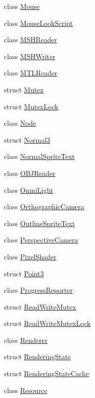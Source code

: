 \begin{DoxyCompactItemize}
\item 
class \hyperlink{classmage_1_1_mouse}{Mouse}
\item 
class \hyperlink{classmage_1_1_mouse_look_script}{Mouse\+Look\+Script}
\item 
class \hyperlink{classmage_1_1_m_s_h_reader}{M\+S\+H\+Reader}
\item 
class \hyperlink{classmage_1_1_m_s_h_writer}{M\+S\+H\+Writer}
\item 
class \hyperlink{classmage_1_1_m_t_l_reader}{M\+T\+L\+Reader}
\item 
struct \hyperlink{structmage_1_1_mutex}{Mutex}
\item 
struct \hyperlink{structmage_1_1_mutex_lock}{Mutex\+Lock}
\item 
class \hyperlink{classmage_1_1_node}{Node}
\item 
struct \hyperlink{structmage_1_1_normal3}{Normal3}
\item 
class \hyperlink{classmage_1_1_normal_sprite_text}{Normal\+Sprite\+Text}
\item 
class \hyperlink{classmage_1_1_o_b_j_reader}{O\+B\+J\+Reader}
\item 
class \hyperlink{classmage_1_1_omni_light}{Omni\+Light}
\item 
class \hyperlink{classmage_1_1_orthographic_camera}{Orthographic\+Camera}
\item 
class \hyperlink{classmage_1_1_outline_sprite_text}{Outline\+Sprite\+Text}
\item 
class \hyperlink{classmage_1_1_perspective_camera}{Perspective\+Camera}
\item 
class \hyperlink{classmage_1_1_pixel_shader}{Pixel\+Shader}
\item 
struct \hyperlink{structmage_1_1_point3}{Point3}
\item 
class \hyperlink{classmage_1_1_progress_reporter}{Progress\+Reporter}
\item 
struct \hyperlink{structmage_1_1_read_write_mutex}{Read\+Write\+Mutex}
\item 
struct \hyperlink{structmage_1_1_read_write_mutex_lock}{Read\+Write\+Mutex\+Lock}
\item 
class \hyperlink{classmage_1_1_renderer}{Renderer}
\item 
struct \hyperlink{structmage_1_1_rendering_state}{Rendering\+State}
\item 
struct \hyperlink{structmage_1_1_rendering_state_cache}{Rendering\+State\+Cache}
\item 
class \hyperlink{classmage_1_1_resource}{Resource}

\end{DoxyCompactItemize}
